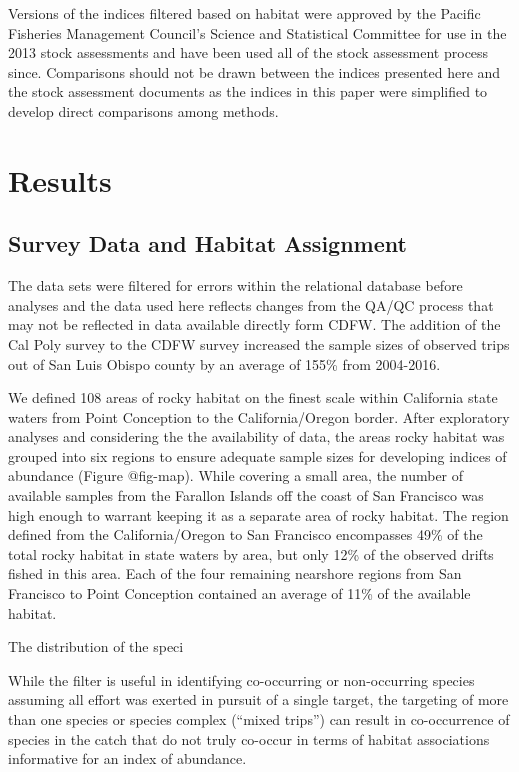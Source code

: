 \documentclass[
  authoryear,
  preprint,
  3p]{elsarticle}
\begin{document}
Versions of the indices filtered based on habitat were approved by the
Pacific Fisheries Management Council's Science and Statistical Committee
for use in the 2013 stock assessments and have been used all of the
stock assessment process since. Comparisons should not be drawn between
the indices presented here and the stock assessment documents as the
indices in this paper were simplified to develop direct comparisons
among methods.

\hypertarget{results}{%
\section{Results}\label{results}}

\hypertarget{survey-data-and-habitat-assignment-1}{%
\subsection{Survey Data and Habitat
Assignment}\label{survey-data-and-habitat-assignment-1}}

The data sets were filtered for errors within the relational database
before analyses and the data used here reflects changes from the QA/QC
process that may not be reflected in data available directly form CDFW.
The addition of the Cal Poly survey to the CDFW survey increased the
sample sizes of observed trips out of San Luis Obispo county by an
average of 155\% from 2004-2016.

We defined 108 areas of rocky habitat on the finest scale within
California state waters from Point Conception to the California/Oregon
border. After exploratory analyses and considering the the availability
of data, the areas rocky habitat was grouped into six regions to ensure
adequate sample sizes for developing indices of abundance (Figure
@fig-map). While covering a small area, the number of available samples
from the Farallon Islands off the coast of San Francisco was high enough
to warrant keeping it as a separate area of rocky habitat. The region
defined from the California/Oregon to San Francisco encompasses 49\% of
the total rocky habitat in state waters by area, but only 12\% of the
observed drifts fished in this area. Each of the four remaining
nearshore regions from San Francisco to Point Conception contained an
average of 11\% of the available habitat.

The distribution of the speci

While the filter is useful in identifying co-occurring or non-occurring
species assuming all effort was exerted in pursuit of a single target,
the targeting of more than one species or species complex (``mixed
trips'') can result in co-occurrence of species in the catch that do not
truly co-occur in terms of habitat associations informative for an index
of abundance.
\end{document}
